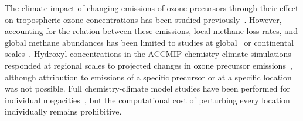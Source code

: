 The climate impact of changing emissions of ozone precursors through their effect on tropospheric ozone concentrations has been studied previously~\citep{ref:shindell2013}. However, accounting for the relation between these emissions, local methane loss rates, and global methane abundances has been limited to studies at global~\citep{ref:prather2001,ref:fry2012,ref:holmes2013} or continental scales~\citep{ref:naik2005,ref:macintosh2015}.  Hydroxyl concentrations in the ACCMIP chemistry climate simulations responded at regional scales to projected changes in ozone precursor emissions~\citep{ref:voulgarakis2013}, although attribution to emissions of a specific precursor or at a specific location was not possible. Full chemistry-climate model studies have been performed for individual megacities~\citep{ref:dang2015}, but the computational cost of perturbing every location individually remains prohibitive. 






